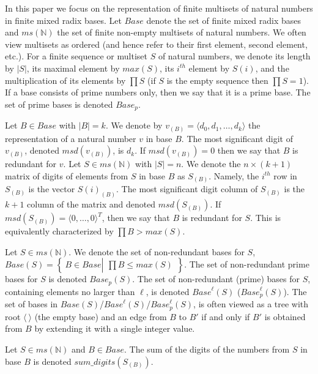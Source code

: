 \documentclass[envcountsame]{llncs}
\newcommand\tuple[1]{\langle #1 \rangle}
\newcommand{\Base}{\mathit{Base}}
\newcommand{\intMultiSet}{\mathit{ms(\mathbb{N})}}
\newcommand{\sumDigits}{\mathit{sum\_digits}}
\newcommand{\sset}[2]{\left\{~#1  \left|
      \begin{array}{l}#2\end{array}
    \right.     \right\}}
\begin{document}
In this paper we focus on the representation of finite multisets of
natural numbers in finite mixed radix bases.  Let $\Base$ denote the
set of finite mixed radix bases and $\intMultiSet$ the set of finite
non-empty multisets of natural numbers. We often view multisets as
ordered (and hence refer to their first element, second element, etc.).
For a finite sequence or multiset $S$ of natural numbers, we denote
its length by $|S|$, its maximal element by $max(S)$, its $i^{th}$
element by $S(i)$, and the multiplication of its elements by $\prod
S$ (if $S$ is the empty sequence then $\prod S=1$).
If a base consists of prime numbers only, then we say that it is a
prime base. The set of prime bases is denoted $\Base_p$.

Let $B\in\Base$ with $|B|=k$. We denote by $v_{(B)}=\tuple{d_0, d_1,
  \ldots, d_k}$ the representation of a natural number $v$ in base
$B$. The most significant digit
 of $v_{(B)}$, denoted $msd(v_{(B)})$, is
$d_k$.  If $msd(v_{(B)})=0$ then we say that $B$ is redundant for $v$.
Let $S\in\intMultiSet$ with $|S|=n$. We denote the $n\times (k+1)$
matrix of digits of elements from $S$ in base $B$ as
$S_{(B)}$. Namely, the $i^{th}$ row in $S_{(B)}$ is the vector
$S(i)_{(B)}$. The most significant digit column of $S_{(B)}$ is the
$k+1$ column of the matrix and denoted $msd(S_{(B)})$.  If
$msd(S_{(B)})=\tuple{0,\ldots,0}^T$, then we say that $B$ is redundant
for $S$.
This is equivalently characterized by $\prod B > max(S)$.

\begin{definition}
\label{def:nrb}
  Let $S\in\intMultiSet$. We denote the set of non-redundant bases for
  $S$, $\Base(S) = \sset{B\in\Base}{\prod B \leq max(S)}$. The set of  
  non-redundant prime bases for $S$ is denoted $\Base_p(S)$. 
  \pagebreak
The set of non-redundant (prime) bases for $S$, containing elements
  no larger than $\ell$, is denoted $\Base^\ell(S)$
  ($\Base_p^\ell(S)$). 
The set of bases in $\Base(S)$/$\Base^\ell(S)$/$\Base_p^\ell(S)$, is
  often viewed as a tree with root $\tuple{~}$ (the empty base) and an
  edge from $B$ to $B'$ if and only if $B'$ is obtained from $B$ by
  extending it with a single integer value.
\end{definition}


\begin{definition}[$\sumDigits$]\label{def:sumDigits}
  Let $S\in\intMultiSet$ and $B\in\Base$.  The sum of the digits of
  the numbers from $S$ in base $B$ is denoted $\sumDigits(S_{(B)})$.
\end{definition}
\end{document}
